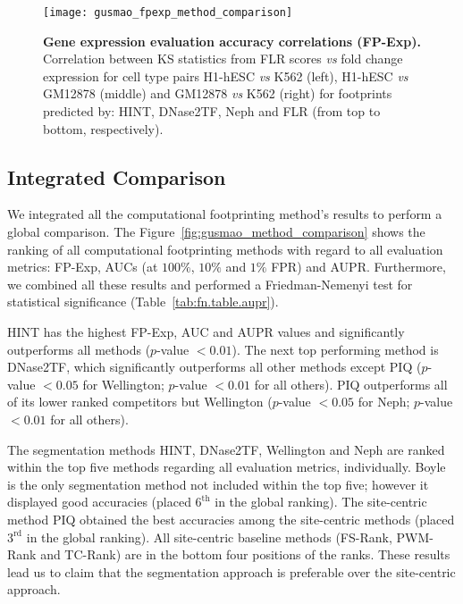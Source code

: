 \begin{figure}[h!]
\centering
\texttt{[image: gusmao\_fpexp\_method\_comparison]}
\caption[Gene expression evaluation accuracy correlations (FP-Exp)]{\textbf{Gene expression evaluation accuracy correlations (FP-Exp).} Correlation between KS statistics from FLR scores \textit{vs} fold change expression for cell type pairs H1-hESC \textit{vs} K562 (left), H1-hESC \textit{vs} GM12878 (middle) and GM12878 \textit{vs} K562 (right) for footprints predicted by: HINT, DNase2TF, Neph and FLR (from top to bottom, respectively). }
\label{fig:gusmao_fpexp_method_comparison}
\end{figure}

\subsection{Integrated Comparison}
\label{sec:integrated.comparison}

We integrated all the computational footprinting method's results to perform a global comparison. The Figure~\ref{fig:gusmao_method_comparison} shows the ranking of all computational footprinting methods with regard to all evaluation metrics: FP-Exp, AUCs (at $100\%$, $10\%$ and $1\%$ FPR) and AUPR. Furthermore, we combined all these results and performed a Friedman-Nemenyi test for statistical significance (Table~\ref{tab:fn.table.aupr}).

HINT has the highest FP-Exp, AUC and AUPR values and significantly outperforms all methods ($p$-value $< 0.01$). The next top performing method is DNase2TF, which significantly outperforms all other methods except PIQ ($p$-value $< 0.05$ for Wellington; $p$-value $< 0.01$ for all others). PIQ outperforms all of its lower ranked competitors but Wellington ($p$-value $< 0.05$ for Neph; $p$-value $< 0.01$ for all others).

The segmentation methods HINT, DNase2TF, Wellington and Neph are ranked within the top five methods regarding all evaluation metrics, individually. Boyle is the only segmentation method not included within the top five; however it displayed good accuracies (placed $6^{\text{th}}$ in the global ranking). The site-centric method PIQ obtained the best accuracies among the site-centric methods (placed $3^{\text{rd}}$ in the global ranking). All site-centric baseline methods (FS-Rank, PWM-Rank and TC-Rank) are in the bottom four positions of the ranks. These results lead us to claim that the segmentation approach is preferable over the site-centric approach.

